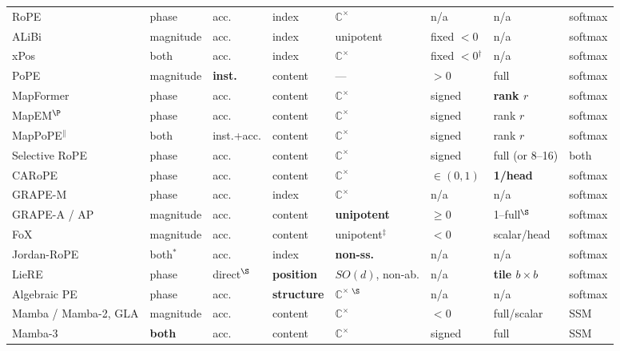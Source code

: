\documentclass[11pt]{article}
\newcommand{\C}{\mathbb{C}}
\begin{document}
\begin{table}
\begin{tabular}{llllllll}
RoPE              & phase      & acc.    & index  & $\C^\times$ & n/a    & n/a        & softmax \\
ALiBi             & magnitude  & acc.    & index  & unipotent  & fixed $<0$ & n/a     & softmax \\
xPos              & both       & acc.    & index  & $\C^\times$ & fixed $<0$$^{\dagger}$ & n/a & softmax \\
PoPE              & magnitude  & \textbf{inst.} & content & ---  & $>0$    & full      & softmax \\
\midrule
MapFormer         & phase      & acc.    & content & $\C^\times$ & signed & \textbf{rank $r$} & softmax \\
MapEM$^{\P}$      & phase      & acc.    & content & $\C^\times$ & signed & rank $r$ & softmax \\
MapPoPE$^{\parallel}$ & both  & inst.+acc. & content & $\C^\times$ & signed & rank $r$ & softmax \\
Selective RoPE    & phase      & acc.    & content & $\C^\times$ & signed & full (or 8--16) & both \\
CARoPE            & phase      & acc.    & content & $\C^\times$ & \textbf{$\in(0,1)$} & \textbf{1/head} & softmax \\
\midrule
GRAPE-M           & phase      & acc.    & index & $\C^\times$ & n/a & n/a  & softmax \\
GRAPE-A / AP      & magnitude  & acc.    & content & \textbf{unipotent} & \textbf{$\ge 0$} & 1--full$^{\S}$ & softmax \\
FoX               & magnitude  & acc.    & content & unipotent$^\ddagger$  & $<0$    & scalar/head & softmax \\
Jordan-RoPE       & both$^\ast$ & acc.   & index   & \textbf{non-ss.} & n/a & n/a & softmax \\
LieRE             & phase      & direct$^{\S}$ & \textbf{position} & $SO(d)$, non-ab. & n/a & \textbf{tile $b\!\times\!b$} & softmax \\
Algebraic PE      & phase      & acc.    & \textbf{structure} & $\C^\times$\,$^{\S}$ & n/a & n/a & softmax \\
\midrule
Mamba / Mamba-2, GLA & magnitude & acc.  & content & $\C^\times$ & $<0$   & full/scalar & SSM \\
Mamba-3           & \textbf{both} & acc. & content & $\C^\times$ & signed & full & SSM \\
\bottomrule
\end{tabular}
\label{tab:map}
\end{table}
\end{document}
